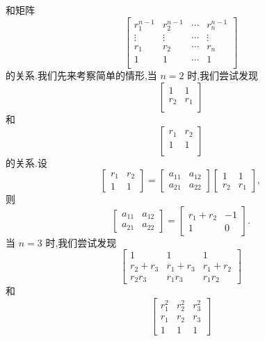 \documentclass[a4paper]{article}
\begin{document}
和矩阵
\begin{equation}
  \label{eq:4}
  \begin{bmatrix}
r_1^{n-1}&r_2^{n-1}&\cdots&r_n^{n-1}\\
\vdots&\vdots&\cdots&\vdots\\
r_1&r_2&\cdots&r_n\\
  1&1&\cdots&1\\
\end{bmatrix}
\end{equation}
的关系.我们先来考察简单的情形,当 $n=2$ 时,我们尝试发现
\begin{equation}
  \label{eq:5}
  \begin{bmatrix}
    1&1\\
r_2&r_1\\
  \end{bmatrix}
\end{equation}
和
\begin{equation}
  \label{eq:6}
\begin{bmatrix}
r_1&r_2\\
    1&1\\
\end{bmatrix}
\end{equation}
的关系.设
$$
\begin{bmatrix}
  r_{1}&r_{2}\\
1&1
\end{bmatrix}=\begin{bmatrix}
  a_{11}&a_{12}\\
a_{21}&a_{22}
\end{bmatrix}\begin{bmatrix}
  1&1\\
r_{2}&r_{1}
\end{bmatrix},
$$
则
$$
\begin{bmatrix}
  a_{11}&a_{12}\\
a_{21}&a_{22}
\end{bmatrix}=\begin{bmatrix}
  r_1+r_2&-1\\
1&0
\end{bmatrix}.
$$
当 $n=3$ 时,我们尝试发现
\begin{equation}
  \label{eq:11.01}
  \begin{bmatrix}
      1&1&1\\
r_2+r_3&r_1+r_3&r_1+r_2\\
r_2r_3&r_1r_3&r_1r_2
  \end{bmatrix}
\end{equation}
和
\begin{equation}
  \label{eq:11.02}
  \begin{bmatrix}
      r_1^2&r_2^2&r_3^2\\
r_1&r_2&r_3\\
1&1&1
  \end{bmatrix}
\end{equation}
\end{document}
